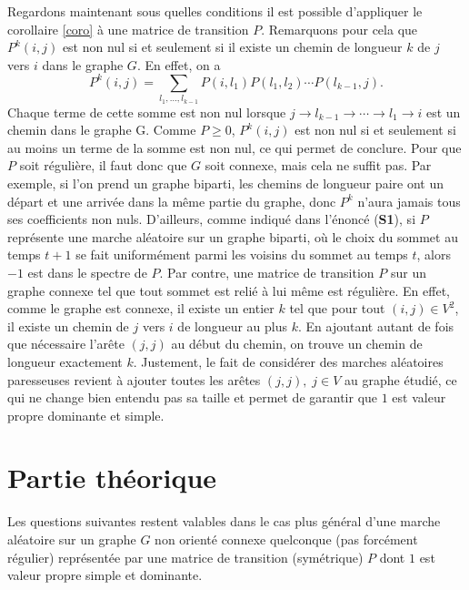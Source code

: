 \documentclass[11pt]{article}
\renewcommand{\geq}{\geqslant}
\theoremstyle{plain}
\begin{document}
Regardons maintenant sous quelles conditions il est possible d'appliquer le corollaire \ref{coro} à une matrice de transition $P$. Remarquons pour cela que $P^{k}(i,j)$ est non nul si et seulement si il existe un chemin de longueur $k$ de $j$ vers $i$ dans le graphe $G$. En effet, on a
$$P^{k}(i,j) = \sum_{l_1, \ldots, l_{k-1}} P(i,l_1)P(l_1, l_2)\cdots P(l_{k-1},j).$$
Chaque terme de cette somme est non nul lorsque $j \to l_{k-1} \to \cdots \to l_1 \to i$ est un chemin dans le graphe G. Comme $P \geq 0$, $P^{k}(i,j)$ est non nul si et seulement si au moins un terme de la somme est non nul, ce qui permet de conclure. Pour que $P$ soit régulière, il faut donc que $G$ soit connexe, mais cela ne suffit pas. Par exemple, si l'on prend un graphe biparti, les chemins de longueur paire ont un départ et une arrivée dans la même \og{}partie \fg{} du graphe, donc $P^{k}$ n'aura jamais tous ses coefficients non nuls. D'ailleurs, comme indiqué dans l'énoncé (\textbf{S1}), si $P$ représente une marche aléatoire sur un graphe biparti, où le choix du sommet au temps $t+1$ se fait uniformément parmi les voisins du sommet au temps $t$, alors $-1$ est dans le spectre de $P$. Par contre, une matrice de transition $P$ sur un graphe connexe tel que tout sommet est relié à lui même est régulière. En effet, comme le graphe est connexe, il existe un entier $k$ tel que pour tout $(i,j) \in V^2$, il existe un chemin de $j$ vers $i$ de longueur au plus $k$. En ajoutant autant de fois que nécessaire l'arête $(j,j)$ au début du chemin, on trouve un chemin de longueur exactement $k$. Justement, le fait de considérer des marches aléatoires paresseuses revient à ajouter toutes les arêtes $(j,j), \; j \in V$ au graphe étudié, ce qui ne change bien entendu pas sa taille et permet de garantir que $1$ est valeur propre dominante et simple. 
\section{Partie théorique}
Les questions suivantes restent valables dans le cas plus général d'une marche aléatoire sur un graphe $G$ non orienté connexe quelconque (pas forcément régulier) représentée par une matrice de transition (symétrique) $P$ dont $1$ est valeur propre simple et dominante.
\end{document}
